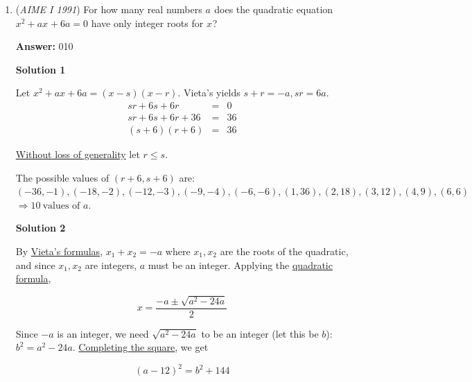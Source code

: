 \begin{enumerate}
 The given finite expansion can then be easily seen to reduce to the \href{https://artofproblemsolving.com/wiki/index.php?title=Quadratic\_equation}{quadratic equation}, $x_{}^{2}-\sqrt{19}x-91=0$. The solutions are $x_{\pm}^{}=$$\frac{\sqrt{19}\pm\sqrt{383}}{2}$. Therefore, $A_{}^{}=\vert x_{+}\vert+\vert x_{-}\vert=\sqrt{383}$. We conclude that $A_{}^{2}=\boxed{383}$.

 


	\item (\textit{AIME I 1991}) For how many real numbers $a^{}_{}$ does the quadratic equation $x^2 + ax^{}_{} + 6a=0$ have only integer roots for $x^{}_{}$?


 
 \textbf{Answer: }010



\textbf{Solution 1}

Let $x^2 + ax + 6a = (x - s)(x - r)$. Vieta's yields $s + r = - a, sr = 6a$.
 \begin{eqnarray*}sr + 6s + 6r &=& 0\\ sr + 6s + 6r + 36 &=& 36\\ (s + 6)(r + 6) &=& 36 \end{eqnarray*}

 \href{https://artofproblemsolving.com/wiki/index.php?title=Without\_loss\_of\_generality}{Without loss of generality} let $r \le s$.

 The possible values of $(r + 6,s + 6)$ are:$( - 36, - 1),( - 18, - 2),( - 12, - 3),( - 9, - 4),( - 6, - 6),(1,36),(2,18),(3,12),(4,9),(6,6)$$\Rightarrow \boxed{10}\ \text{values of } a$.

 



\textbf{Solution 2}

By \href{https://artofproblemsolving.com/wiki/index.php?title=Vieta\%27s\_formulas}{Vieta's formulas}, $x_1 + x_2 = -a$ where $x_1, x_2$ are the roots of the quadratic, and since $x_1,x_2$ are integers, $a$ must be an integer. Applying the \href{https://artofproblemsolving.com/wiki/index.php?title=Quadratic\_formula}{quadratic formula}, 

 
 \[x = \frac{-a \pm \sqrt{a^2 - 24a}}{2}\]

 Since $-a$ is an integer, we need $\sqrt{a^2-24a}$ to be an integer (let this be $b$): $b^2 = a^2 - 24a$. \href{https://artofproblemsolving.com/wiki/index.php?title=Completing\_the\_square}{Completing the square}, we get

 
 \[(a - 12)^2 = b^2 + 144\]


\end{enumerate}
